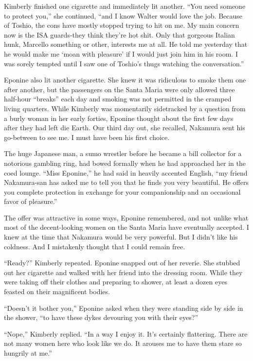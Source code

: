\documentclass[]{article}
\begin{document}
{Kimberly finished one cigarette and immediately lit another. “You need someone to protect you,” she continued, “and I know Walter would love the job. Because of Toshio, the cons have mostly stopped trying to hit on me. My main concern now is the ISA guards-they think they’re hot shit. Only that gorgeous Italian hunk, Marcello something or other, interests me at all. He told me yesterday that he would make me ‘moan with pleasure’ if I would just join him in his room. I was sorely tempted until I saw one of Toshio’s thugs watching the conversation.”

Eponine also lit another cigarette. She knew it was ridiculous to smoke them one after another, but the passengers on the Santa Maria were only allowed three half-hour “breaks” each day and smoking was not permitted in the cramped living quarters. While Kimberly was momentarily sidetracked by a question from a burly woman in her early forties, Eponine thought about the first few days after they had left die Earth. Our third day out, she recalled, Nakamura sent his go-between to see me. I must have been his first choice.

The huge Japanese man, a sumo wrestler before he became a bill collector for a notorious gambling ring, had bowed formally when he had approached her in the coed lounge. “Miss Eponine,” he had said in heavily accented English, “my friend Nakamura-san has asked me to tell you that he finds you very beautiful. He offers you complete protection in exchange for your companionship and an occasional favor of pleasure.”

The offer was attractive in some ways, Eponine remembered, and not unlike what most of the decent-looking women on the Santa Maria have eventually accepted. I knew at the time that Nakamura would be very powerful. But I didn’t like his coldness. And I mistakenly thought that I could remain free.

“Ready?” Kimberly repeated. Eponine snapped out of her reverie. She stubbed out her cigarette and walked with her friend into the dressing room. While they were taking off their clothes and preparing to shower, at least a dozen eyes feasted on their magnificent bodies.

“Doesn’t it bother you,” Eponine asked when they were standing side by side in the shower, “to have these dykes devouring you with their eyes?”

“Nope,” Kimberly replied. “In a way I enjoy it. It’s certainly flattering. There are not many women here who look like we do. It arouses me to have them stare so hungrily at me.”

}
\end{document}

